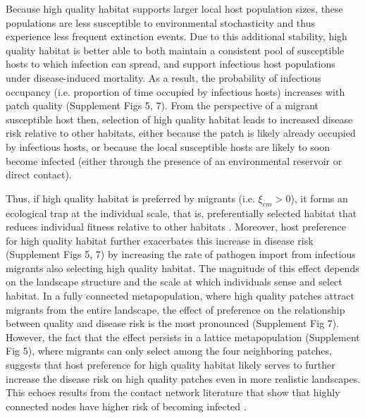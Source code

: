 \documentclass{article}
\begin{document}
Because high quality habitat supports larger local host population sizes, these populations are less susceptible to environmental stochasticity and thus experience less frequent extinction events.
Due to this additional stability, high quality habitat is better able to both maintain a consistent pool of susceptible hosts to which infection can spread, and support infectious host populations under disease-induced mortality. 
As a result, the probability of infectious occupancy (i.e. proportion of time occupied by infectious hosts) increases with patch quality (Supplement Figs 5, 7).
From the perspective of a migrant susceptible host then, selection of high quality habitat leads to increased disease risk relative to other habitats, either because the patch is likely already occupied by infectious hosts, or because the local susceptible hosts are likely to soon become infected (either through the presence of an environmental reservoir or direct contact).

Thus, if high quality habitat is preferred by migrants (i.e. $\xi_{em} > 0$), it forms an ecological trap at the individual scale, that is, preferentially selected habitat that reduces individual fitness relative to other habitats \cite{Robertson2006}.
Moreover, host preference for high quality habitat further exacerbates this increase in disease risk (Supplement Figs 5, 7) by increasing the rate of pathogen import from infectious migrants also selecting high quality habitat.
The magnitude of this effect depends on the landscape structure and the scale at which individuals sense and select habitat.
In a fully connected metapopulation, where high quality patches attract migrants from the entire landscape, the effect of preference on the relationship between quality and disease risk is the most pronounced (Supplement Fig 7).
However, the fact that the effect persists in a lattice metapopulation (Supplement Fig 5), where migrants can only select among the four neighboring patches, suggests that host preference for high quality habitat likely serves to further increase the disease risk on high quality patches even in more realistic landscapes.
This echoes results from the contact network literature that show that highly connected nodes have higher risk of becoming infected \cite{Christley2005, Keeling2005}.
\end{document}

